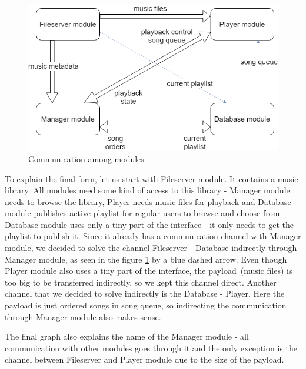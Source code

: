 \begin{figure}[ht]\centering
\includegraphics[width=1.0\textwidth]{img/CommunicationGraph}
\caption{Communication among modules}
\label{fig02:communicationAmongModules}
\end{figure}

\par
To explain the final form, let us start with Fileserver module. It contains a music library. All modules need some kind of access to this library - Manager module needs to browse the library, Player needs music files for playback and Database module publishes active playlist for regular users to browse and choose from. Database module uses only a tiny part of the interface - it only needs to get the playlist to publish it. Since it already has a communication channel with Manager module, we decided to solve the channel Fileserver - Database indirectly through Manager module, as seen in the figure \ref{fig02:communicationAmongModules} by a blue dashed arrow. Even though Player module also uses a tiny part of the interface, the payload~(music files) is too big to be transferred indirectly, so we kept this channel direct. Another channel that we decided to solve indirectly is the Database - Player. Here the payload is just ordered songs in song queue, so indirecting the communication through Manager module also makes sense.
\par
The final graph also explains the name of the Manager module - all communication with other modules goes through it and the only exception is the channel between Fileserver and Player module due to the size of the payload.

